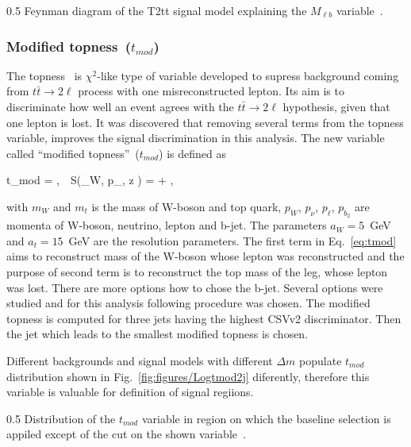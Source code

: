                  {0.5}       %
                 { Feynman diagram of the T2tt signal model explaining the $M_{\ell b}$ variable~\cite{CMS:2016vew}. }

\subsubsection{Modified topness~($t_{mod}$)}

The topness~\cite{Graesser:2012qy} is $\chi^{2}$-like type of variable developed to supress background coming from $t \bar{t} \to 2\ell$ process with one misreconstructed lepton. Its aim is to discriminate how well an event agrees with the $t \bar{t} \to 2\ell$ hypothesis, given that one lepton is lost. It was discovered that removing several terms from the topness variable, improves the signal discrimination in this analysis. The new variable called ``modified topness''~($t_{mod}$) is defined as


{
 t_{mod} = ,~~S(_{W}, p_{\nu, z} ) =  + ,
}

with $m_{W}$ and  $m_{t}$ is the mass of W-boson and top quark, ${p}_{W}$, ${p}_{\nu}$, ${p}_{\ell}$, ${p}_{b_{2}}$ are momenta of W-boson, neutrino, lepton and b-jet. The parameters $a_{W} =5$~GeV and $a_{t}=15$~GeV are the resolution parameters. The first term in Eq.~\ref{eq:tmod} aims to reconstruct mass of the W-boson whose lepton was reconstructed and the purpose of second term is to reconstruct the top mass of the leg, whose lepton was lost. There are more options how to chose the  b-jet. Several options were studied and for this analysis following procedure was chosen. The modified topness is computed for three jets having the highest CSVv2 discriminator. Then the jet which leads to the smallest modified topness is chosen.

Different backgrounds and signal models with different $\Delta m$ populate $t_{mod}$ distribution shown in Fig.~\ref{fig:figures/Logtmod2j} diferently, therefore this variable is valuable for definition of signal regiions.

                 {0.5}       %
                 { Distribution of the $t_{mod}$ variable in region on which the baseline selection is appiled except of the cut on the shown variable~\cite{website:stopSupp}. }

